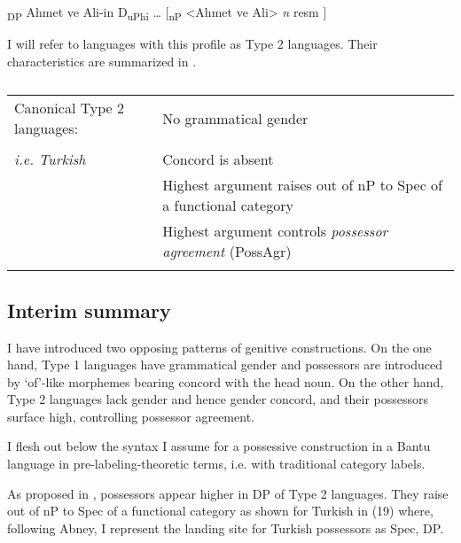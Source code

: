 \documentclass[output=paper
,modfonts
,nonflat]{langsci/langscibook}
\begin{document}
\begin{exe}
	{\lbrack}\textsubscript{DP} Ahmet ve Ali-in D\textsubscript{uPhi} … [\textsubscript{nP} <Ahmet ve Ali>  \textit{n} resm ]{\rbrack}
\end{exe}
I will refer to languages with this profile as Type 2 languages. Their characteristics are summarized in .
\begin{table}
	\caption{}
	\label{tab:2}
	\begin{tabularx}{\textwidth}{lX}
		\lsptoprule
		Canonical Type 2 languages: &  No grammatical gender\\ \\
		\textit{i.e. Turkish}  & Concord is absent\\
		& Highest argument raises out of nP to Spec of a functional category\\
		& Highest argument controls \textit{possessor agreement} (PossAgr)\\
		\lspbottomrule
	\end{tabularx}
\end{table} \newpage \noindent
\subsection{Interim summary} 

I have introduced two opposing patterns of genitive constructions. On the one hand, Type 1 languages have grammatical gender and possessors are introduced by ‘of’-like morphemes bearing concord with the head noun. On the other hand, Type 2 languages lack gender and hence gender concord, and their possessors surface high, controlling possessor agreement. 

I flesh out below the syntax I assume for a possessive construction in a Bantu language in pre-labeling-theoretic terms, i.e. with traditional category labels.

\begin{figure}[!h]
	\begin{exe}
	\end{exe}
\end{figure}
\noindent As proposed in \citet{Abney1987}, possessors appear higher in DP of Type 2 languages. They raise out of nP to Spec of a functional category as shown for Turkish in (19) where, following Abney, I represent the landing site for Turkish possessors as Spec, DP.          
\end{document}
